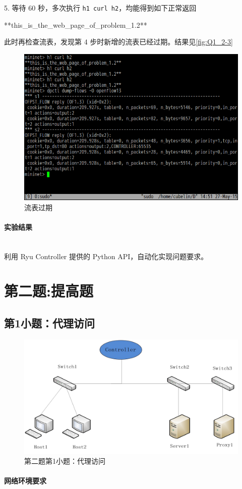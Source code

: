 \documentclass[format=draft,language=chinese,category=SDN]{hustreport}
\newcommand{\myparagraph}[1]{\paragraph{#1}\mbox{}\\}
\newcommand{\code}{\texttt}
\begin{document}
5. 等待 60 秒，多次执行 \code{h1 curl h2}，均能得到如下正常返回
\begin{center}
**this\_is\_the\_web\_page\_of\_problem\_1.2**
\end{center}
此时再检查流表，发现第 4 步时新增的流表已经过期。结果见\autoref{fig:Q1_2-3}

\begin{figure}[!h]
\centering
\includegraphics[width=.618\textwidth]{fig/1_2-3.png}
\caption{流表过期}\label{fig:Q1_2-3}
\end{figure}

\myparagraph{实验结果}

利用 Ryu Controller 提供的 Python API，自动化实现问题要求。

\clearpage

\section{第二题:提高题}\label{sec:Q2}
\subsection{第1小题：代理访问}\label{sec:Q2_1}

\begin{figure}[!h]
\centering
\includegraphics[width=.618\textwidth]{fig/2_1-0.png}
\caption{第二题第1小题：代理访问}\label{fig:Q2_1-0}
\end{figure}

\myparagraph{网络环境要求}
\end{document}
